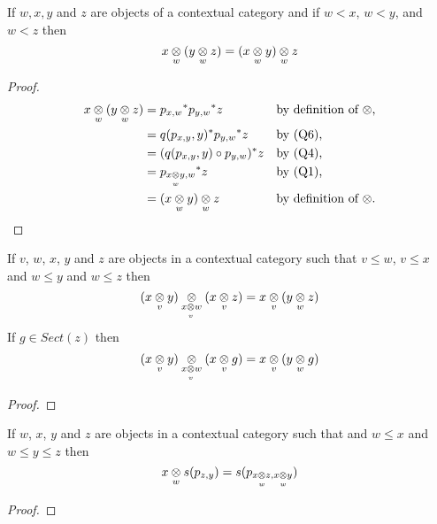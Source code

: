 
\vspace{0.15cm}
\begin{lemma}
If $w,x,y$ and $z$ are objects of a contextual category \catcw and if $w<x$, $w<y$, and $w<z$ then
\begin{equation*}
\crossx{x}{(\crossx{y}{z}{w})}{w} = \crossx{(\crossx{x}{y}{w})}{z}{w}
\end{equation*}
\end{lemma}
\begin{proof}
\begin{align*}
\crossx{x}{(\crossx{y}{z}{w})}{w} 
                   &= {p_{x,w}} ^* {p_{y,w}} ^* z             && \mbox{by definition of $\crossx{}{}{}$,}  \\
                   &= q(p_{x,y},y)^*{p_{y,w}} ^* z            && \mbox{by (Q6),}      \\
                   &= (q(p_{x,y},y) \circ p_{y,w}) ^* z       && \mbox{by (Q4),}                           \\
                   &= {p_{\crossx{x}{y}{w},w}} ^* z           && \mbox{by (Q1),}    \\
                   &= \crossx{(\crossx{x}{y}{w})}  {z}{w}     && \mbox{by definition of $\crossx{}{}{}$.}
\end{align*}
\end{proof}

\begin{lemma}
If $v$, $w$, $x$, $y$ and $z$ are objects in a contextual category  \catcw 
such that $v \leq w$, $v \leq x$ and $w \leq y$ and $w \leq z$ then
\begin{equation*}
\crossx{(\crossx{x}{y}{v})}{(\crossx{x}{z}{v})}{\crossx{x}{w}{v}}=\crossx{x}{{(\crossx{y}{z}{w})}}{v}
\end{equation*}
If $g \in Sect(z)$ then
\begin{equation*}
\crossx{(\crossx{x}{y}{v})}{(\crossx{x}{g}{v})}{\crossx{x}{w}{v}}=\crossx{x}{{(\crossx{y}{g}{w})}}{v}
\end{equation*}
\end{lemma}
\begin{proof}
\tbd
\end{proof}

\begin{lemma}
If $w$, $x$, $y$ and $z$ are objects in a contextual category  \catcw 
such that  and $w \leq x$ and $w \leq y \leq z$ then
\begin{equation*}
\crossx{x}{s(p_{z,y})}{w}= s(p_{\crossx{x}{z}{w},\crossx{x}{y}{w}})
\end{equation*}
\end{lemma}
\begin{proof}
\tbd
\end{proof}


